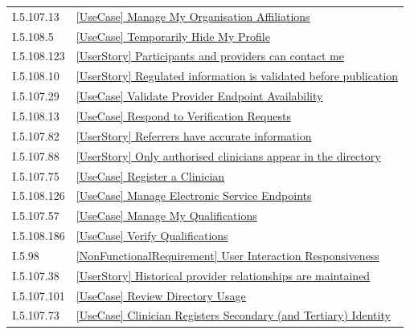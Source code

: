 \begin{longtable}{p{.22\linewidth}p{.73\linewidth}}
I.5.107.13 & \hyperref[element:001339dd862b4c06ac641ecef795d82a]{[UseCase] Manage My Organisation Affiliations} \\
I.5.108.5 & \hyperref[element:016b5cc594de42deb4058f52d1fb1087]{[UseCase] Temporarily Hide My Profile} \\
I.5.108.123 & \hyperref[element:022a70ed8fab4d76a565a9201f9649d2]{[UserStory] Participants and providers can contact me} \\
I.5.108.10 & \hyperref[element:02654538c0734094a178230332473721]{[UserStory] Regulated information is validated before publication} \\
I.5.107.29 & \hyperref[element:032022d695134ffbb74c5c875c6a48b2]{[UseCase] Validate Provider Endpoint Availability} \\
I.5.108.13 & \hyperref[element:040a18e072a54be098dfcaad9bc22354]{[UseCase] Respond to Verification Requests} \\
I.5.107.82 & \hyperref[element:040c946182c24239875c4668f63fb799]{[UserStory] Referrers have accurate information} \\
I.5.107.88 & \hyperref[element:047d7f6692fe4603a3d21a2f7202dc6b]{[UserStory] Only authorised clinicians appear in the directory} \\
I.5.107.75 & \hyperref[element:07431ae4e7cf468196fc7402708f0278]{[UseCase] Register a Clinician} \\
I.5.108.126 & \hyperref[element:0823d236b3284482b5021a7fda3c0529]{[UseCase] Manage Electronic Service Endpoints} \\
I.5.107.57 & \hyperref[element:0bd92b28846644a69a88577293d434cc]{[UseCase] Manage My Qualifications} \\
I.5.108.186 & \hyperref[element:0c85a18a1213483da6216e553f951150]{[UseCase] Verify Qualifications} \\
I.5.98 & \hyperref[element:0f07f89a3a854bfdac4d4fc423feefca]{[NonFunctionalRequirement] User Interaction Responsiveness} \\
I.5.107.38 & \hyperref[element:0fa127939fd04b54ab51c0d82a5eda11]{[UserStory] Historical provider relationships are maintained} \\
I.5.107.101 & \hyperref[element:0fbb35579ff44a10aa5a8affda85320e]{[UseCase] Review Directory Usage} \\
I.5.107.73 & \hyperref[element:13918485ecf04ea3b0f7d802c6a31365]{[UseCase] Clinician Registers Secondary (and Tertiary) Identity} \\

\end{longtable}
